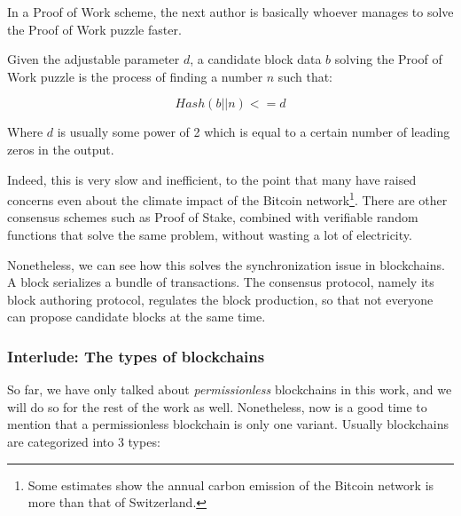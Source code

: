 In a Proof of Work scheme, the next author is basically whoever manages to solve the Proof of Work
puzzle faster.

\begin{definition} \label{def:pow} Given the adjustable parameter $d$, a candidate block data $b$
	solving the Proof of Work puzzle is the process of finding a number $n$ such that:

	\begin{equation}
		Hash(b || n) <= d
	\end{equation}

Where $d$ is usually some power of 2 which is equal to a certain number of leading zeros in the
output.
\end{definition}

Indeed, this is very slow and inefficient, to the point that many have raised concerns even about
the climate impact of the Bitcoin network\footnote{Some estimates show the annual carbon emission of
the Bitcoin network is more than that of Switzerland\cite{stollCarbonFootprintBitcoin2019}.}. There
are other consensus schemes such as Proof of Stake, combined with verifiable random functions that
solve the same problem, without wasting a lot of electricity.

Nonetheless, we can see how this solves the synchronization issue in blockchains. A block serializes
a bundle of transactions. The consensus protocol, namely its block authoring protocol, regulates the
block production, so that not everyone can propose candidate blocks at the same time.

\subsubsection{Interlude: The types of blockchains}

So far, we have only talked about \textit{permissionless} blockchains in this work, and we will do
so for the rest of the work as well. Nonetheless, now is a good time to mention that a
permissionless blockchain is only one variant. Usually blockchains are categorized into 3 types:


